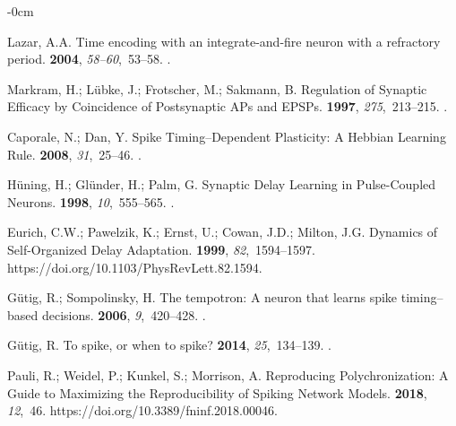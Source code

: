 \documentclass[brainsci, %
               review,accept,pdftex,moreauthors
               ]{Definitions/mdpi}
\begin{document}
\begin{adjustwidth}{-\extralength}{0cm}
\begin{thebibliography}{999}
Lazar, A.A.
\newblock Time encoding with an integrate-and-fire neuron with a refractory
  period.
 {\bf 2004}, {\em 58--60},~53--58.
.

Markram, H.; Lübke, J.; Frotscher, M.; Sakmann, B.
\newblock Regulation of {Synaptic} {Efficacy} by {Coincidence} of
  {Postsynaptic} {APs} and {EPSPs}.
 {\bf 1997}, {\em 275},~213--215.
.

Caporale, N.; Dan, Y.
\newblock Spike {Timing}–{Dependent} {Plasticity}: {A} {Hebbian} {Learning}
  {Rule}.
 {\bf 2008}, {\em 31},~25--46.
.

Hüning, H.; Glünder, H.; Palm, G.
\newblock Synaptic {Delay} {Learning} in {Pulse}-{Coupled} {Neurons}.
 {\bf 1998}, {\em 10},~555--565.
.

Eurich, C.W.; Pawelzik, K.; Ernst, U.; Cowan, J.D.; Milton, J.G.
\newblock Dynamics of {Self}-{Organized} {Delay} {Adaptation}.
 {\bf 1999}, {\em 82},~1594--1597.
  {{https://doi.org/10.1103/PhysRevLett.82.1594}}.

Gütig, R.; Sompolinsky, H.
\newblock The tempotron: A neuron that learns spike timing–based decisions.
 {\bf 2006}, {\em 9},~420--428.
.

Gütig, R.
\newblock To spike, or when to spike?
 {\bf 2014}, {\em 25},~134--139.
.

Pauli, R.; Weidel, P.; Kunkel, S.; Morrison, A.
\newblock Reproducing {Polychronization}: {A} {Guide} to {Maximizing} the
  {Reproducibility} of {Spiking} {Network} {Models}.
 {\bf 2018}, {\em 12},~46.
 {{https://doi.org/10.3389/fninf.2018.00046}}.


\end{thebibliography}
\end{adjustwidth}
\end{document}
